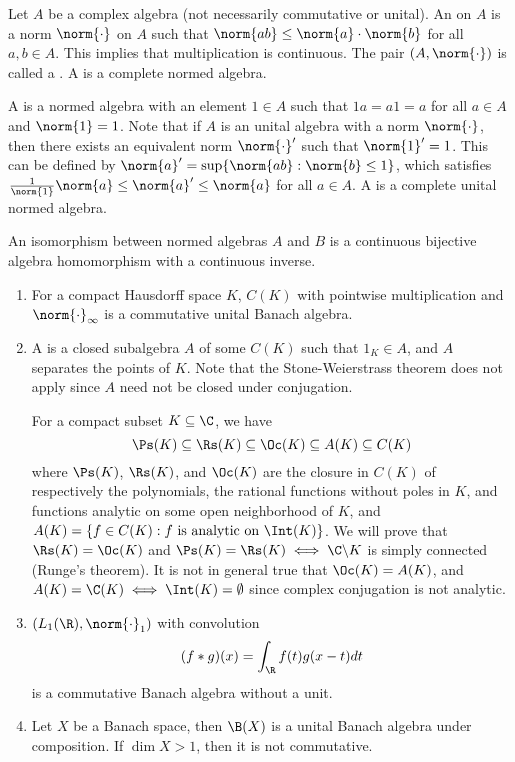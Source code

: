 \documentclass[a4paper]{article}
\begin{document}
\noindent Let $A$ be a complex algebra (not necessarily commutative or unital). An  on $A$ is a norm $\norm{\cdot}$ on $A$ such that $\norm{ab}\leq\norm{a}\cdot\norm{b}$ for all $a,b\in A$. This implies that multiplication is continuous. The pair $(A,\norm{\cdot})$ is called a . A  is a complete normed algebra.

A  is a normed algebra with an element $1\in A$ such that $1a=a1=a$ for all $a\in A$ and $\norm{1}=1$. Note that if $A$ is an unital algebra with a norm $\norm{\cdot}$, then there exists an equivalent norm $\norm{\cdot}'$ such that $\norm{1}'=1$. This can be defined by $\norm{a}'=\sup\{\norm{ab}:\norm{b}\leq 1\}$, which satisfies $\frac{1}{\norm{1}}\norm{a}\leq\norm{a}'\leq\norm{a}$ for all $a\in A$. A  is a complete unital normed algebra.

An isomorphism between normed algebras $A$ and $B$ is a continuous bijective algebra homomorphism with a continuous inverse.

\begin{eg}
	\begin{enumerate}[label=(\arabic*)]
		\item For a compact Hausdorff space $K$, $C(K)$ with pointwise multiplication and $\norm{\cdot}_\infty$ is a commutative unital Banach algebra.
		\item A  is a closed subalgebra $A$ of some $C(K)$ such that $1_K\in A$, and $A$ separates the points of $K$. Note that the Stone-Weierstrass theorem does not apply since $A$ need not be closed under conjugation.

		For a compact subset $K\subseteq\C$, we have
		\[
		 \Ps(K)\subseteq \Rs(K)\subseteq\Oc(K)\subseteq A(K)\subseteq C(K)
		\]
		where $\Ps(K)$, $\Rs(K)$, and $\Oc(K)$ are the closure in $C(K)$ of respectively the polynomials, the rational functions without poles in $K$, and functions analytic on some open neighborhood of $K$, and $A(K)=\{f\in C(K):f\text{ is analytic on }\Int(K)\}$. We will prove that $\Rs(K)=\Oc(K)$ and $\Ps(K)=\Rs(K)\iff\C\backslash K$ is simply connected (Runge's theorem). It is not in general true that $\Oc(K)=A(K)$, and $A(K)=\C(K)\iff \Int(K)=\emptyset$ since complex conjugation is not analytic.
		\item $(L_1(\R),\norm{\cdot}_1)$ with convolution
		\[
		 (f*g)(x)=\int_\R f(t)g(x-t)dt
		\]
		is a commutative Banach algebra without a unit.
		\item Let $X$ be a Banach space, then $\B(X)$ is a unital Banach algebra under composition. If $\dim X>1$, then it is not commutative.
	\end{enumerate}
\end{eg}
\end{document}
